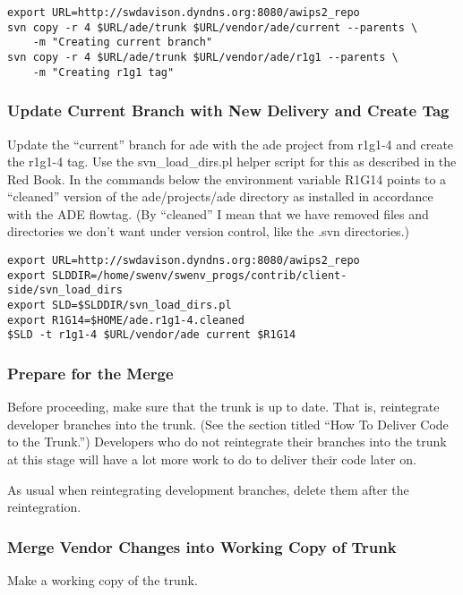 \begin{verbatim}
export URL=http://swdavison.dyndns.org:8080/awips2_repo
svn copy -r 4 $URL/ade/trunk $URL/vendor/ade/current --parents \
    -m "Creating current branch"
svn copy -r 4 $URL/ade/trunk $URL/vendor/ade/r1g1 --parents \
    -m "Creating r1g1 tag"
\end{verbatim}


\subsubsection{Update Current Branch with New Delivery and Create Tag}

Update the ``current'' branch for ade with the ade project
from r1g1-4 and create the r1g1-4 tag.  
Use the svn\_load\_dirs.pl
helper script for this as described in the Red Book.  In the 
commands below the environment variable R1G14 points to a ``cleaned''
version of the ade/projects/ade directory as installed in 
accordance with the ADE flowtag.  (By ``cleaned'' I mean that 
we have removed files and directories we don't want under version
control, like the .svn directories.)

\begin{verbatim}
export URL=http://swdavison.dyndns.org:8080/awips2_repo
export SLDDIR=/home/swenv/swenv_progs/contrib/client-side/svn_load_dirs
export SLD=$SLDDIR/svn_load_dirs.pl
export R1G14=$HOME/ade.r1g1-4.cleaned
$SLD -t r1g1-4 $URL/vendor/ade current $R1G14
\end{verbatim}

\subsubsection{Prepare for the Merge}

Before proceeding, make sure that the trunk is up to date.
That is, reintegrate developer branches into the trunk.
(See the section titled ``How To Deliver Code to the Trunk.'')
Developers who do not reintegrate their branches into the trunk
at this stage will have a lot more work to do to deliver their
code later on.

As usual when reintegrating development branches, delete them after
the reintegration.

\subsubsection{Merge Vendor Changes into Working Copy of Trunk}

Make a working copy of the trunk.

